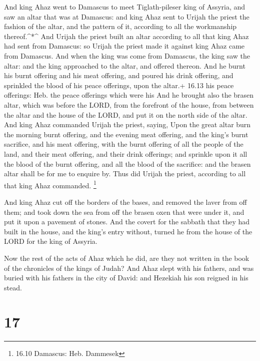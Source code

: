  And king Ahaz went to Damascus to meet Tiglath-pileser
king of Assyria, and saw an altar that was at Damascus: and king Ahaz
sent to Urijah the priest the fashion of the altar, and the pattern of
it, according to all the workmanship thereof.\^{}*\^{}  And
Urijah the priest built an altar according to all that king Ahaz had
sent from Damascus: so Urijah the priest made it against king Ahaz came
from Damascus.  And when the king was come from Damascus,
the king saw the altar: and the king approached to the altar, and
offered thereon.  And he burnt his burnt offering and his
meat offering, and poured his drink offering, and sprinkled the blood of
his peace offerings, upon the altar.+ 16.13 his peace offerings: Heb.
the peace offerings which were his  And he brought also the
brasen altar, which was before the LORD, from the forefront of the
house, from between the altar and the house of the LORD, and put it on
the north side of the altar.  And king Ahaz commanded
Urijah the priest, saying, Upon the great altar burn the morning burnt
offering, and the evening meat offering, and the king's burnt sacrifice,
and his meat offering, with the burnt offering of all the people of the
land, and their meat offering, and their drink offerings; and sprinkle
upon it all the blood of the burnt offering, and all the blood of the
sacrifice: and the brasen altar shall be for me to enquire by.
 Thus did Urijah the priest, according to all that king
Ahaz commanded. \footnote{16.10 Damascus: Heb. Dammesek}

 And king Ahaz cut off the borders of the bases, and
removed the laver from off them; and took down the sea from off the
brasen oxen that were under it, and put it upon a pavement of stones.
 And the covert for the sabbath that they had built in the
house, and the king's entry without, turned he from the house of the
LORD for the king of Assyria.

 Now the rest of the acts of Ahaz which he did, are they
not written in the book of the chronicles of the kings of Judah?
 And Ahaz slept with his fathers, and was buried with his
fathers in the city of David: and Hezekiah his son reigned in his stead.

\hypertarget{section-16}{%
\section{17}\label{section-16}}

